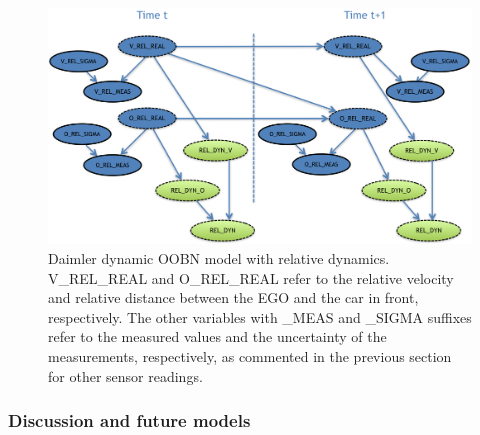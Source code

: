 \begin{figure}[ht!]
\begin{center}
\includegraphics[scale=0.48]{./figures/Daimlerreldyn.png}
\end{center}
\caption{\label{Figure:daimlerreldyn}Daimler dynamic OOBN model with relative dynamics. V\_REL\_REAL and O\_REL\_REAL refer to the relative velocity and relative distance between the EGO and the car in front, respectively. The other variables with \_MEAS and \_SIGMA suffixes refer to the measured values and the uncertainty of the measurements, respectively, as commented in the previous section for other sensor readings.}
\end{figure}


%
%
%

\subsubsection{Discussion and future models}\label{subsubsection:daimlerfuture}

